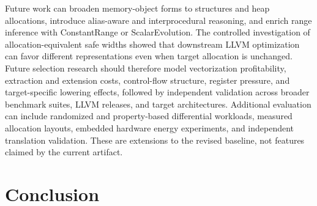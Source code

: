 \documentclass[11pt,twocolumn]{article}
\begin{document}
Future work can broaden memory-object forms to structures and heap allocations,
introduce alias-aware and interprocedural reasoning, and enrich range inference
with ConstantRange or ScalarEvolution. The controlled investigation
of allocation-equivalent safe widths showed that downstream LLVM optimization
can favor different representations even when target allocation is unchanged.
Future selection research should therefore model vectorization profitability,
extraction and extension costs, control-flow structure, register pressure, and
target-specific lowering effects, followed by independent validation across
broader benchmark suites, LLVM releases, and target architectures. Additional
evaluation can include randomized and property-based differential workloads,
measured allocation layouts, embedded hardware energy experiments, and
independent translation validation. These are extensions to the revised
baseline, not features claimed by the current artifact.

\section{Conclusion}
\end{document}
